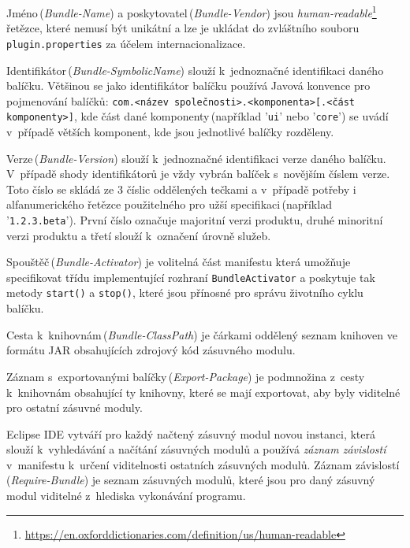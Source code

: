       Jméno\,(\emph{Bundle-Name}) a poskytovatel\,(\emph{Bundle-Vendor}) jsou \emph{human-readable}\footnote{\url{https://en.oxforddictionaries.com/definition/us/human-readable}} řetězce, které nemusí být unikátní a lze je ukládat do zvláštního souboru \texttt{plugin.properties} za účelem internacionalizace.

      Identifikátor\,(\emph{Bundle-SymbolicName}) slouží k~jednoznačné identifikaci daného balíčku. Většinou se jako identifikátor balíčku používá Javová konvence pro pojmenování balíčků: \texttt{com.<název společnosti>.<komponenta>[.<část komponenty>]}, kde část dané komponenty\,(například '\texttt{ui}' nebo '\texttt{core}') se uvádí v~případě větších komponent, kde jsou jednotlivé balíčky rozděleny.
      
      Verze\,(\emph{Bundle-Version}) slouží k~jednoznačné identifikaci verze daného balíčku. V~případě shody identifikátorů je vždy vybrán balíček s~novějším číslem verze. Toto číslo se skládá ze 3 číslic oddělených tečkami a v~případě potřeby i alfanumerického řetězce použitelného pro užší specifikaci\,(například '\texttt{1.2.3.beta}'). První číslo označuje majoritní verzi produktu, druhé minoritní verzi produktu a třetí slouží k~označení úrovně služeb.

      Spouštěč\,(\emph{Bundle-Activator}) je volitelná část manifestu která umožňuje specifikovat třídu implementující rozhraní \texttt{BundleActivator} a poskytuje tak metody \texttt{start()} a \texttt{stop()}, které jsou přínosné pro správu životního cyklu balíčku.

      Cesta k~knihovnám\,(\emph{Bundle-ClassPath}) je čárkami oddělený seznam knihoven ve formátu JAR obsahujících zdrojový kód zásuvného modulu.

      Záznam s~exportovanými balíčky\,(\emph{Export-Package}) je podmnožina z~cesty k~knihovnám obsahující ty knihovny, které se mají exportovat, aby byly viditelné pro ostatní zásuvné moduly.

      Eclipse IDE vytváří pro každý načtený zásuvný modul novou instanci, která slouží k~vyhledávání a načítání zásuvných modulů a používá \emph{záznam závislostí} v~manifestu k~určení viditelnosti ostatních zásuvných modulů. Záznam závislostí\,(\emph{Require-Bundle}) je seznam zásuvných modulů, které jsou pro daný zásuvný modul viditelné z~hlediska vykonávání programu.

